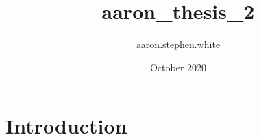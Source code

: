 \documentclass{article}
\title{aaron_thesis_2}
\author{aaron.stephen.white }
\date{October 2020}
\begin{document}
\maketitle

\section{Introduction}
\end{document}
